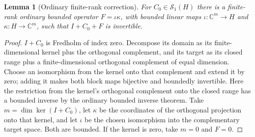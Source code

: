 \documentclass[11pt,a4paper]{article}
\numberwithin{equation}{section}
\newtheorem{lemma}[lemma]{Lemma}
\theoremstyle{definition}
\theoremstyle{remark}
\newcommand{\C}{\mathbb C}
\newcommand{\SH}{\mathcal S_1(H)}
\begin{document}
\begin{lemma}[Ordinary finite-rank correction]\label{ihs:fr:lem:correction}
For $C_0\in\SH$ there is a finite-rank ordinary bounded operator
$F=\iota\kappa$, with bounded linear maps $\iota:\C^m\to H$ and
$\kappa:H\to\C^m$, such that $I+C_0+F$ is
invertible.
\end{lemma}
\begin{proof}
$I+C_0$ is Fredholm of index zero. Decompose its domain as its
finite-dimensional kernel plus the orthogonal complement, and its target as
its closed range plus a finite-dimensional orthogonal complement of equal
dimension. Choose an isomorphism from the kernel onto that complement and
extend it by zero; adding it makes both block maps bijective and boundedly
invertible. Here the restriction from the kernel's orthogonal complement
onto the closed range has a bounded inverse by the ordinary bounded inverse
theorem. Take $m=\dim\ker(I+C_0)$, let $\kappa$ be the coordinates of the
orthogonal projection onto that kernel, and let $\iota$ be the chosen
isomorphism into the complementary target space. Both are bounded. If the
kernel is zero, take $m=0$ and $F=0$.
\end{proof}
\end{document}
